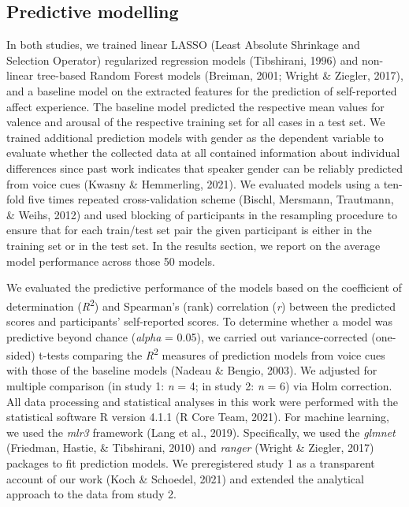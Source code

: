 \documentclass[
  english,
  man,floatsintext]{apa6}
\begin{document}
\hypertarget{predictive-modelling}{%
\subsection{Predictive modelling}\label{predictive-modelling}}

In both studies, we trained linear LASSO (Least Absolute Shrinkage and Selection Operator) regularized regression models (Tibshirani, 1996) and non-linear tree-based Random Forest models (Breiman, 2001; Wright \& Ziegler, 2017), and a baseline model on the extracted features for the prediction of self-reported affect experience. The baseline model predicted the respective mean values for valence and arousal of the respective training set for all cases in a test set. We trained additional prediction models with gender as the dependent variable to evaluate whether the collected data at all contained information about individual differences since past work indicates that speaker gender can be reliably predicted from voice cues (Kwasny \& Hemmerling, 2021). We evaluated models using a ten-fold five times repeated cross-validation scheme (Bischl, Mersmann, Trautmann, \& Weihs, 2012) and used blocking of participants in the resampling procedure to ensure that for each train/test set pair the given participant is either in the training set or in the test set. In the results section, we report on the average model performance across those 50 models.

We evaluated the predictive performance of the models based on the coefficient of determination (\emph{R}\textsuperscript{2}) and Spearman's (rank) correlation (\emph{r}) between the predicted scores and participants' self-reported scores. To determine whether a model was predictive beyond chance (\emph{alpha} = 0.05), we carried out variance-corrected (one-sided) t-tests comparing the \emph{R}\textsuperscript{2} measures of prediction models from voice cues with those of the baseline models (Nadeau \& Bengio, 2003). We adjusted for multiple comparison (in study 1: \emph{n} = 4; in study 2: \emph{n} = 6) via Holm correction.
All data processing and statistical analyses in this work were performed with the statistical software R version 4.1.1 (R Core Team, 2021). For machine learning, we used the \emph{mlr3} framework (Lang et al., 2019). Specifically, we used the \emph{glmnet} (Friedman, Hastie, \& Tibshirani, 2010) and \emph{ranger} (Wright \& Ziegler, 2017) packages to fit prediction models. We preregistered study 1 as a transparent account of our work (Koch \& Schoedel, 2021) and extended the analytical approach to the data from study 2.
\end{document}
